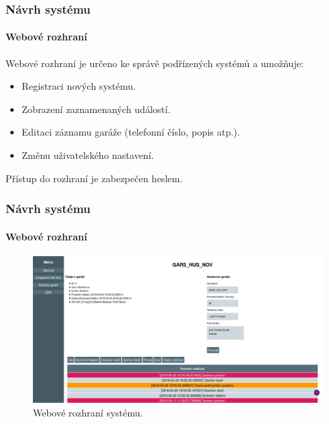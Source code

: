 \documentclass{beamer}
\begin{document}
  \begin{frame}
    \frametitle{Návrh systému}
    \framesubtitle{Webové rozhraní}

    Webové rozhraní je určeno ke správě podřízených systémů a umožňuje:

    \begin{itemize}
      \item Registraci nových systému.
      \item Zobrazení zaznamenaných událostí.
      \item Editaci záznamu garáže (telefonní číslo, popis atp.).
      \item Změnu uživatelského nastavení.
    \end{itemize}

    Přístup do rozhraní je zabezpečen heslem.
    
  \end{frame}

  \begin{frame}
    \frametitle{Návrh systému}
    \framesubtitle{Webové rozhraní}


    \begin{figure}
        \includegraphics[scale=0.161]{../images/webp.png}
        \caption{Webové rozhraní systému.}
      \end{figure}
    
  \end{frame}
\end{document}
